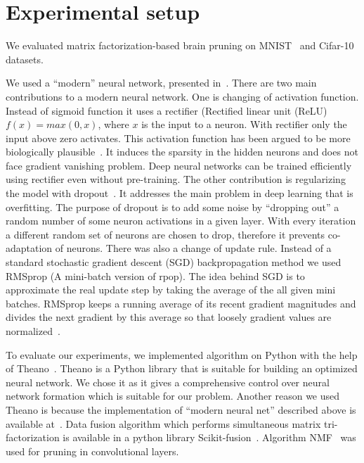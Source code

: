 \documentclass{article} %
\begin{document}
\section{Experimental setup}

We evaluated matrix factorization-based brain pruning on 
MNIST~\cite{lecun-mnisthandwrittendigit-2010} and 
Cifar-10~\cite{krizhevsky2009learning} datasets. 

We used a “modern” neural network, presented in~\cite{github}. There are two
main contributions to a modern neural network. One is changing of activation
function. Instead of sigmoid function it uses a rectifier (Rectified linear 
unit (ReLU) $f(x) = max(0, x)$, where $x$ is the input to a neuron. With
rectifier only the input above zero activates. This
activation function has been argued to be more biologically
plausible~\cite{AISTATS2011_GlorotBB11}. It induces the sparsity in the hidden
neurons and does not face gradient vanishing problem. Deep neural networks
can be trained efficiently using rectifier even without pre-training. 
The other contribution is regularizing the model with
dropout~\cite{srivastava2014dropout}. It addresses
the main problem in deep learning that is overfitting. The purpose of dropout
is to add some noise by “dropping out” a random number of some neuron
activations in a given layer. With every iteration a different random set of
neurons are chosen to drop, therefore it prevents co-adaptation of neurons.
There was also a change of update rule. Instead of a standard stochastic
gradient descent (SGD) backpropagation method we used RMSprop (A mini-batch
version of rpop). The idea behind SGD is to approximate the real update step by
taking the average of the all given mini batches.
RMSprop keeps a running average of its recent gradient magnitudes and divides
the next gradient by this average so that loosely gradient values are
normalized~\cite{lecture}. 

To evaluate our experiments, we implemented algorithm on Python with the help
of Theano~\cite{Bastien-Theano-2012, bergstra+al:2010-scipy}. Theano is a
Python library that is suitable for building an optimized neural network. We
chose it as it gives a comprehensive control over neural network formation
which is suitable for our problem. Another reason we used Theano is because the
implementation of “modern neural net” described above is available 
at~\cite{github}.
Data fusion algorithm which performs simultaneous matrix
tri-factorization is available in a python library
Scikit-fusion~\cite{zitnik2015data}. Algorithm NMF~\cite{Zitnik2012} was used 
for 
pruning in convolutional layers.
\end{document}
